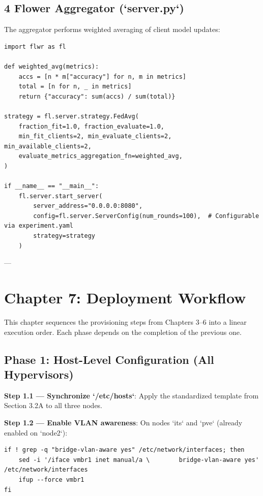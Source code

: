 \documentclass[conference]{IEEEtran}
\begin{document}
\subsection{4 Flower Aggregator (`server.py`)}

The aggregator performs weighted averaging of client model updates:

\begin{verbatim}
import flwr as fl

def weighted_avg(metrics):
    accs = [n * m["accuracy"] for n, m in metrics]
    total = [n for n, _ in metrics]
    return {"accuracy": sum(accs) / sum(total)}

strategy = fl.server.strategy.FedAvg(
    fraction_fit=1.0, fraction_evaluate=1.0,
    min_fit_clients=2, min_evaluate_clients=2, min_available_clients=2,
    evaluate_metrics_aggregation_fn=weighted_avg,
)

if __name__ == "__main__":
    fl.server.start_server(
        server_address="0.0.0.0:8080",
        config=fl.server.ServerConfig(num_rounds=100),  # Configurable via experiment.yaml
        strategy=strategy
    )
\end{verbatim}

---


\section{Chapter 7: Deployment Workflow}

This chapter sequences the provisioning steps from Chapters 3–6 into a linear execution order. Each phase depends on the completion of the previous one.


\subsection{Phase 1: Host-Level Configuration (All Hypervisors)}

\textbf{Step 1.1 — Synchronize `/etc/hosts`}: Apply the standardized template from Section 3.2A to all three nodes.

\textbf{Step 1.2 — Enable VLAN awareness}: On nodes `its` and `pve` (already enabled on `node2`):

\begin{verbatim}
if ! grep -q "bridge-vlan-aware yes" /etc/network/interfaces; then
    sed -i '/iface vmbr1 inet manual/a \        bridge-vlan-aware yes' /etc/network/interfaces
    ifup --force vmbr1
fi
\end{verbatim}
\end{document}
